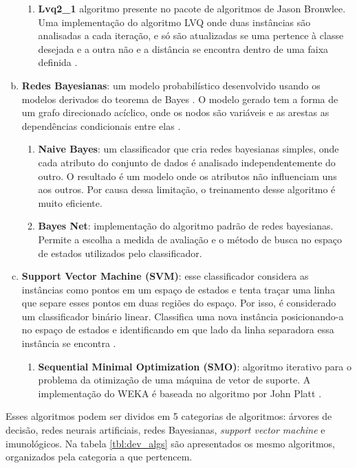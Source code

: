 \begin{enumerate}[a)]
\begin{enumerate}[1.]
            \item \textbf{Lvq2\_1} algoritmo presente no pacote de algoritmos de Jason Bronwlee. Uma implementação do algoritmo LVQ onde duas instâncias são analisadas a cada iteração, e só são atualizadas se uma pertence à classe desejada e a outra não e a distância se encontra dentro de uma faixa definida \cite{Brownlee2011w}.
        \end{enumerate}
    \item \textbf{Redes Bayesianas}: um modelo probabilístico desenvolvido usando os modelos derivados do teorema de Bayes \cite{Bayes1763}. O modelo gerado tem a forma de um grafo direcionado acíclico, onde os nodos são variáveis e as arestas as dependências condicionais entre elas \cite{Pearl1988}.
        \begin{enumerate}[1.]
            \item \textbf{Naive Bayes}: um classificador que cria redes bayesianas simples, onde cada atributo do conjunto de dados é analisado independentemente do outro. O resultado é um modelo onde os atributos não influenciam uns aos outros. Por causa dessa limitação, o treinamento desse algoritmo é muito eficiente.
            \item \textbf{Bayes Net}: implementação do algoritmo padrão de redes bayesianas. Permite a escolha a medida de avaliação e o método de busca no espaço de estados utilizados pelo classificador.
        \end{enumerate}
    \item \textbf{Support Vector Machine (SVM)}: esse classificador considera as instâncias como pontos em um espaço de estados e tenta traçar uma linha que separe esses pontos em duas regiões do espaço. Por isso, é considerado um classificador binário linear. Classifica uma nova instância posicionando-a no espaço de estados e identificando em que lado da linha separadora essa instância se encontra \cite{Cortes1995}.
        \begin{enumerate}[1.]
            \item \textbf{Sequential Minimal Optimization (SMO)}: algoritmo iterativo para o problema da otimização de uma máquina de vetor de suporte. A implementação do WEKA é baseada no algoritmo por John Platt \cite{Platt1998}.
        \end{enumerate}
\end{enumerate}

Esses algoritmos podem ser dividos em 5 categorias de algoritmos: árvores de decisão, redes neurais artificiais, redes Bayesianas, \emph{support vector machine} e imunológicos. Na tabela \ref{tbl:dev_algs} são apresentados os mesmo algoritmos, organizados pela categoria a que pertencem.

